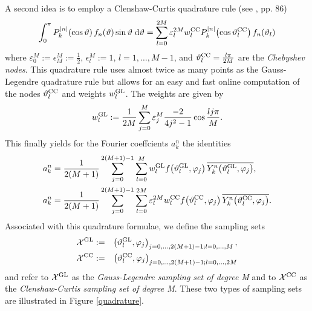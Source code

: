 A second idea is to employ a Clenshaw-Curtis quadrature rule (see \cite{dara}, pp. 86)
\[
  \int_{0}^{\pi} P_{k}^{\left\vert n\right\vert}{\hspace{-0.4ex}}\left(\cos \vartheta\right) f_{n}{\hspace{-0.4ex}}\left(\vartheta\right) \sin \vartheta \; \text{\rm{d}} \vartheta = \sum_{l=0}^{2M} \varepsilon_{l}^{2M} w_{l}^{\mbox{\scriptsize\rm{CC}}} P_{k}^{\left\vert n\right\vert}{\hspace{-0.4ex}}\left(\cos \vartheta_{l}^{\mbox{\scriptsize\rm{CC}}}\right) f_{n}{\hspace{-0.4ex}}\left(\vartheta_{l}\right)
\]
where $\varepsilon_{0}^{M} := \epsilon_{M}^M := \frac{1}{2}$, $\epsilon_{l}^M := 1$, $l=1,\dots,M-1$, and $\vartheta_{l}^{\mbox{\scriptsize\rm{CC}}} = \frac{l\pi}{2M}$ are the \emph{Chebyshev nodes}.
This quadrature rule uses almost twice as many points as the Gauss-Legendre quadrature rule but allows for an easy and fast online computation of the nodes $\vartheta_{l}^{\mbox{\scriptsize\rm{CC}}}$
and weights $w_{l}^{\mbox{\scriptsize\rm{GL}}}$. The weights are given by
\[ w_{l}^{\mbox{\scriptsize\rm{GL}}} := \frac{1}{2M} \sum_{j=0}^{M} \varepsilon_{j}^{M} \frac{-2}{4j^2-1} \cos\frac{lj\pi}{M}.\]
This finally yields for the Fourier coeffcients $a_{k}^n$ the identities 
\begin{equation}
  \label{NFSFT:iDSFT}
  \begin{split}
    a_{k}^n & = \frac{1}{2(M+1)} \sum_{j=0}^{2(M+1)-1} \sum_{l=0}^{M} w_{l}^{\mbox{\scriptsize\rm{GL}}} f{\hspace{-0.4ex}}\left(\vartheta_{l}^{\mbox{\scriptsize\rm{GL}}},\varphi_{j}\right) \overline{Y_{k}^n{\hspace{-0.4ex}}\left(\vartheta_{l}^{\mbox{\scriptsize\rm{GL}}},\varphi_{j}\right)},\\
    a_{k}^n & = \frac{1}{2(M+1)} \sum_{j=0}^{2(M+1)-1} \sum_{l=0}^{2M} \varepsilon_{l}^{2M} w_{l}^{\mbox{\scriptsize\rm{CC}}} f{\hspace{-0.4ex}}\left(\vartheta_{l}^{\mbox{\scriptsize\rm{CC}}},\varphi_{j}\right) 
  \overline{Y_{k}^n{\hspace{-0.4ex}}\left(\vartheta_{l}^{\mbox{\scriptsize\rm{CC}}},\varphi_{j}\right)}.
  \end{split}
\end{equation}
Associated with this quadrature formulae, we define the sampling sets
\begin{eqnarray*}
  \mathcal{X}^{\mbox{\scriptsize\rm{GL}}} & := & \left(\vartheta_{l}^{\mbox{\scriptsize\rm{GL}}},\varphi_{j}\right)_{j=0,\dots,2(M+1)-1;l=0,\dots,M},\\
  \mathcal{X}^{\mbox{\scriptsize\rm{CC}}} & := & \left(\vartheta_{l}^{\mbox{\scriptsize\rm{CC}}},\varphi_{j}\right)_{j=0,\dots,2(M+1)-1;l=0,\dots,2M}
\end{eqnarray*}
and refer to $\mathcal{X}^{\mbox{\scriptsize\rm{GL}}}$ as the \emph{Gauss-Legendre sampling set of degree M} and to $\mathcal{X}^{\mbox{\scriptsize\rm{CC}}}$ as the 
\emph{Clenshaw-Curtis sampling set of degree M}. These two types of sampling sets are illustrated in Figure \ref{quadrature}.
